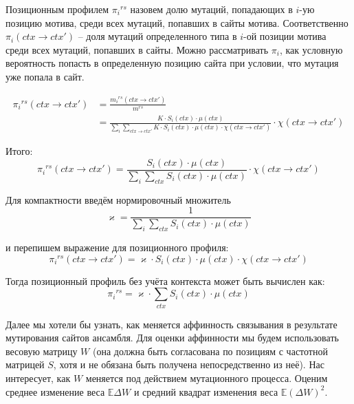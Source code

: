 \documentclass[a4paper]{article}
\newcommand\rs{{}^{rs}}
\newcommand\sumctx{\sum_{ctx}}
\newcommand\dirctx{ctx\to ctx'}
\newcommand\sumdirctx{\sum_{\dirctx}}
\newcommand\mutinregion{m \in rs}
\begin{document}
Позиционным профилем $\pi_i\rs$ назовем долю мутаций, попадающих в $i$-ую позицию мотива, среди всех мутаций, попавших в сайты мотива. Соответственно $\pi_i(\dirctx)$ -- доля мутаций определенного типа в $i$-ой позиции мотива среди всех мутаций, попавших в сайты. Можно рассматривать $\pi_i$, как условную вероятность попасть в определенную позицию сайта при условии, что мутация уже попала в сайт.

\begin{equation*}
\begin{split}
\pi_i\rs(\dirctx) &= \frac{m_i\rs(\dirctx)}{m\rs}\\
         		  &= \frac{K\cdot S_i(ctx)\cdot\mu(ctx)}{\sum_i\sumdirctx K\cdot S_i(ctx)\cdot\mu(ctx)\cdot\chi(\dirctx)}\cdot\chi(\dirctx)
\end{split}
\end{equation*}

\noindent Итого:
\begin{equation}
\pi_i\rs(\dirctx) = \frac{S_i(ctx)\cdot\mu(ctx)}{\sum_i\sumctx S_i(ctx)\cdot\mu(ctx)}\cdot\chi(\dirctx)
\end{equation}

Для компактности введём нормировочный множитель
\begin{equation}
	\varkappa = \frac{1}{\sum_i\sumctx S_i(ctx)\cdot\mu(ctx)}
\end{equation}

и перепишем выражение для позиционного профиля:
\begin{equation}\label{eq:positional_preference}
	\pi_i\rs(\dirctx) = \varkappa\cdot S_i(ctx)\cdot\mu(ctx)\cdot\chi(\dirctx)
\end{equation}


Тогда позиционный профиль без учёта контекста может быть вычислен как:
\begin{equation}
\pi_i\rs = \varkappa\cdot \sumctx S_i(ctx)\cdot\mu(ctx)
\end{equation}


Далее мы хотели бы узнать, как меняется аффинность связывания в результате мутирования сайтов ансамбля. Для оценки аффинности мы будем использовать весовую матрицу $W$ (она должна быть согласована по позициям с частотной матрицей $S$, хотя и не обязана быть получена непосредственно из неё). Нас интересует, как $W$ меняется под действием мутационного процесса.
Оценим среднее изменение веса $\mathbb{E}\Delta W$ и средний квадрат изменения веса $\mathbb{E}(\Delta W)^2$.
\end{document}
